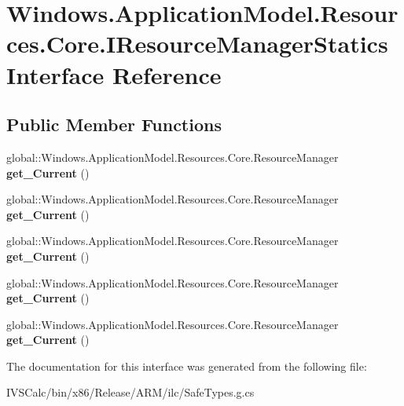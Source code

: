 \hypertarget{interface_windows_1_1_application_model_1_1_resources_1_1_core_1_1_i_resource_manager_statics}{}\section{Windows.\+Application\+Model.\+Resources.\+Core.\+I\+Resource\+Manager\+Statics Interface Reference}
\label{interface_windows_1_1_application_model_1_1_resources_1_1_core_1_1_i_resource_manager_statics}
\subsection*{Public Member Functions}
\begin{DoxyCompactItemize}
\item 
\mbox{\label{interface_windows_1_1_application_model_1_1_resources_1_1_core_1_1_i_resource_manager_statics_a8ae77386a62a0f2956333cff1d6cb6b8}} 
global\+::\+Windows.\+Application\+Model.\+Resources.\+Core.\+Resource\+Manager {\bfseries get\+\_\+\+Current} ()
\item 
\mbox{\label{interface_windows_1_1_application_model_1_1_resources_1_1_core_1_1_i_resource_manager_statics_a8ae77386a62a0f2956333cff1d6cb6b8}} 
global\+::\+Windows.\+Application\+Model.\+Resources.\+Core.\+Resource\+Manager {\bfseries get\+\_\+\+Current} ()
\item 
\mbox{\label{interface_windows_1_1_application_model_1_1_resources_1_1_core_1_1_i_resource_manager_statics_a8ae77386a62a0f2956333cff1d6cb6b8}} 
global\+::\+Windows.\+Application\+Model.\+Resources.\+Core.\+Resource\+Manager {\bfseries get\+\_\+\+Current} ()
\item 
\mbox{\label{interface_windows_1_1_application_model_1_1_resources_1_1_core_1_1_i_resource_manager_statics_a8ae77386a62a0f2956333cff1d6cb6b8}} 
global\+::\+Windows.\+Application\+Model.\+Resources.\+Core.\+Resource\+Manager {\bfseries get\+\_\+\+Current} ()
\item 
\mbox{\label{interface_windows_1_1_application_model_1_1_resources_1_1_core_1_1_i_resource_manager_statics_a8ae77386a62a0f2956333cff1d6cb6b8}} 
global\+::\+Windows.\+Application\+Model.\+Resources.\+Core.\+Resource\+Manager {\bfseries get\+\_\+\+Current} ()
\end{DoxyCompactItemize}


The documentation for this interface was generated from the following file\+:\begin{DoxyCompactItemize}
\item 
I\+V\+S\+Calc/bin/x86/\+Release/\+A\+R\+M/ilc/Safe\+Types.\+g.\+cs\end{DoxyCompactItemize}
